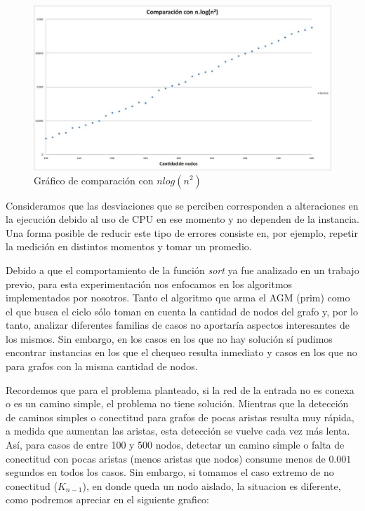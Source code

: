 \documentclass[11pt, a4paper, twoside]{article}
\begin{document}
\begin{figure}[H]
\centering
\includegraphics[scale=0.5]{imagenes/graph1.jpg}
\caption{Gráfico de comparación con $nlog(n^2)$}
\end{figure}

Consideramos que las desviaciones que se perciben corresponden a alteraciones en la ejecución debido al uso de CPU en ese momento y no dependen de la instancia. Una forma posible de reducir este tipo de errores consiste en, por ejemplo, repetir la medición en distintos momentos y tomar un promedio.

Debido a que el comportamiento de la función \textit{sort} ya fue analizado en un trabajo previo, para esta experimentación nos enfocamos en los algoritmos implementados por nosotros. Tanto el algoritmo que arma el AGM (prim) como el que busca el ciclo sólo toman en cuenta la cantidad de nodos del grafo y, por lo tanto, analizar diferentes familias de casos no aportaría aspectos interesantes de los mismos. Sin embargo, en los casos en los que no hay solución sí pudimos encontrar instancias en los que el chequeo resulta inmediato y casos en los que no para grafos con la misma cantidad de nodos. 

Recordemos que para el problema planteado, si la red de la entrada no es conexa o es un camino simple, el problema no tiene solución. Mientras que la detección de caminos simples o conectitud para grafos de pocas aristas resulta muy rápida, a medida que aumentan las aristas, esta detección se vuelve cada vez más lenta. Así, para casos de entre 100 y 500 nodos, detectar un camino simple o  falta de conectitud con pocas aristas (menos aristas que nodos) consume menos de $0.001$ segundos en todos los casos. Sin embargo, si tomamos el caso extremo de no conectitud ($K_{n-1}$),
en donde queda un nodo aislado, la situacion es diferente, como podremos apreciar en el siguiente grafico:
\end{document}
